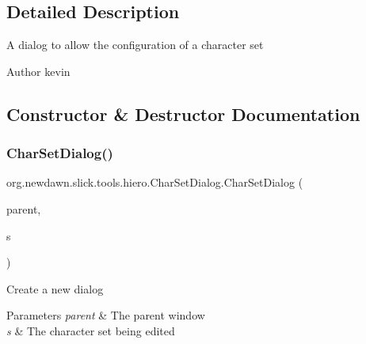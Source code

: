 \subsection{Detailed Description}
A dialog to allow the configuration of a character set

\begin{DoxyAuthor}{Author}
kevin 
\end{DoxyAuthor}


\subsection{Constructor \& Destructor Documentation}
\mbox{\label{classorg_1_1newdawn_1_1slick_1_1tools_1_1hiero_1_1_char_set_dialog_ad98e518276c347b0735f423346969033}} 
\subsubsection{\texorpdfstring{Char\+Set\+Dialog()}{CharSetDialog()}}
{\footnotesize\ttfamily org.\+newdawn.\+slick.\+tools.\+hiero.\+Char\+Set\+Dialog.\+Char\+Set\+Dialog (\begin{DoxyParamCaption}\item[{\mbox{\hyperlink{classorg_1_1newdawn_1_1slick_1_1tools_1_1hiero_1_1_hiero}{Hiero}}}]{parent,  }\item[{\mbox{\hyperlink{classorg_1_1newdawn_1_1slick_1_1tools_1_1hiero_1_1_char_set}{Char\+Set}}}]{s }\end{DoxyParamCaption})\hspace{0.3cm}{\ttfamily [inline]}}

Create a new dialog


\begin{DoxyParams}{Parameters}
{\em parent} & The parent window \\
\hline
{\em s} & The character set being edited \\
\hline
\end{DoxyParams}

